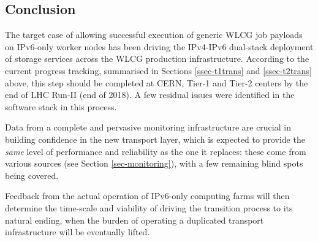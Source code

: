 \subsection{Conclusion}
The target case of allowing successful execution of generic WLCG job payloads
on IPv6-only worker nodes has been driving the IPv4-IPv6 dual-stack deployment
of storage services across the WLCG production infrastructure. According to
the current progress tracking, summarised in Sections \ref{ssec-t1trans} and
\ref{ssec-t2trans} above, this step should be completed at CERN, Tier-1
and Tier-2 centers by the end of LHC Run-II (end of 2018). A few residual
issues were identified in the software stack in this process.
\par
Data from
a complete and pervasive monitoring infrastructure are crucial in building
confidence in the new transport layer, which is expected to provide the
{\it same} level of performance and reliability as the one it replaces: these
come from various sources (see Section \ref{sec-monitoring}), with a few
remaining blind spots being covered.
\par
Feedback from the actual operation of  
IPv6-only computing farms will then determine the time-scale and viability of
driving the transition process to its natural ending, when the burden
of operating a duplicated transport infrastructure will be eventually lifted.

